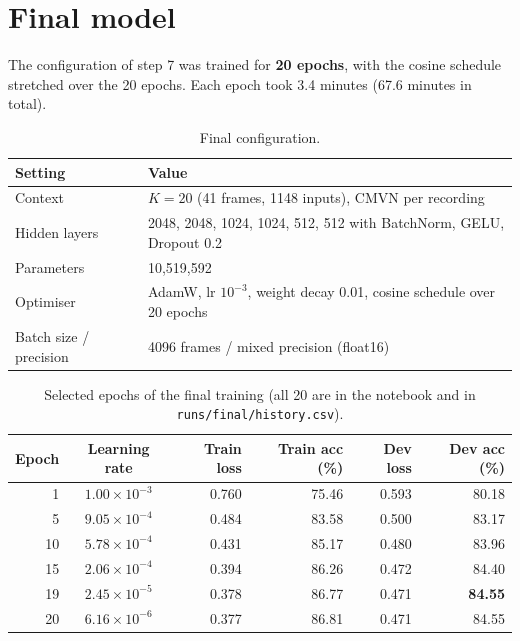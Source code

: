 \documentclass[11pt,a4paper]{article}
\begin{document}
\section{Final model}\label{sec:final}

The configuration of step 7 was trained for \textbf{20 epochs}, with the cosine schedule stretched over
the 20 epochs. Each epoch took 3.4 minutes (67.6 minutes in total).

\begin{table}[H]
\centering
\small
\begin{tabular}{ll}
\toprule
Setting & Value \\
\midrule
Context & $K=20$ (41 frames, 1148 inputs), CMVN per recording \\
Hidden layers & 2048, 2048, 1024, 1024, 512, 512 with BatchNorm, GELU, Dropout 0.2 \\
Parameters & 10,519,592 \\
Optimiser & AdamW, lr $10^{-3}$, weight decay 0.01, cosine schedule over 20 epochs \\
Batch size / precision & 4096 frames / mixed precision (float16) \\
\bottomrule
\end{tabular}
\caption{Final configuration.}
\end{table}

\begin{table}[H]
\centering
\small
\begin{tabular}{rcrrrr}
\toprule
Epoch & Learning rate & Train loss & Train acc (\%) & Dev loss & Dev acc (\%) \\
\midrule
 1 & $1.00\times10^{-3}$ & 0.760 & 75.46 & 0.593 & 80.18 \\
 5 & $9.05\times10^{-4}$ & 0.484 & 83.58 & 0.500 & 83.17 \\
10 & $5.78\times10^{-4}$ & 0.431 & 85.17 & 0.480 & 83.96 \\
15 & $2.06\times10^{-4}$ & 0.394 & 86.26 & 0.472 & 84.40 \\
19 & $2.45\times10^{-5}$ & 0.378 & 86.77 & 0.471 & \textbf{84.55} \\
20 & $6.16\times10^{-6}$ & 0.377 & 86.81 & 0.471 & 84.55 \\
\bottomrule
\end{tabular}
\caption{Selected epochs of the final training (all 20 are in the notebook and in
\texttt{runs/final/history.csv}).}
\end{table}
\end{document}
